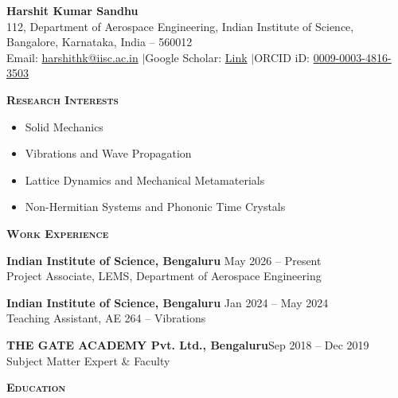 \documentclass[11pt]{article}
\renewcommand{\section}[1]{%
  \par\vspace{12pt}%
  {\centerline{\large\bfseries\scshape #1}}\par\vspace{-6pt}%
  \noindent{\color{black!20}\rule{\linewidth}{1pt}}\par\vspace{5pt}%
}
\newenvironment{list2}{\begin{itemize}[leftmargin=0.2in,itemsep=0pt,topsep=2pt,parsep=0pt]}{\end{itemize}}
\begin{document}
\begin{minipage}{\linewidth}
\centering
{\LARGE \bfseries Harshit Kumar Sandhu}\\[3pt]
{\small 112, Department of Aerospace Engineering, Indian Institute of Science, Bangalore, Karnataka, India -- 560012}\\[2pt]
{\small Email: \href{mailto:harshithk@iisc.ac.in}{harshithk@iisc.ac.in} \quad$\vert$\quad Google Scholar: \href{https://scholar.google.com/citations?hl=en&user=ZChppDUAAAAJ}{Link} \quad$\vert$\quad ORCID iD: \href{https://orcid.org/0009-0003-4816-3503}{0009-0003-4816-3503}}\\[4pt]
\end{minipage}\par
\vspace{4pt}

\section{Research Interests}
\begin{list2}
\item Solid Mechanics
\item Vibrations and Wave Propagation
\item Lattice Dynamics and Mechanical Metamaterials
\item Non-Hermitian Systems and Phononic Time Crystals
\end{list2}

\section{Work Experience}
{\bf Indian Institute of Science, Bengaluru} \hfill May 2026 -- Present\\
Project Associate, LEMS, Department of Aerospace Engineering

\vspace{4pt}
{\bf Indian Institute of Science, Bengaluru} \hfill Jan 2024 -- May 2024\\
Teaching Assistant, AE 264 -- Vibrations

\vspace{4pt}
{\bf THE GATE ACADEMY Pvt. Ltd., Bengaluru}\hfill Sep 2018 -- Dec 2019 \\
Subject Matter Expert \& Faculty

\section{Education}
\end{document}
